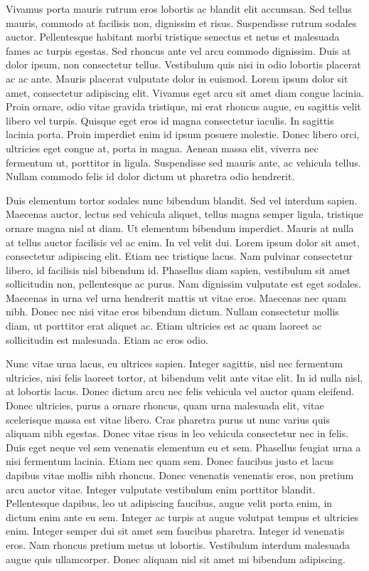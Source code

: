 Vivamus porta mauris rutrum eros lobortis ac blandit elit accumsan.
Sed tellus mauris, commodo at facilisis non, dignissim et risus.
Suspendisse rutrum sodales auctor.
Pellentesque habitant morbi tristique senectus et netus et malesuada fames ac turpis egestas.
Sed rhoncus ante vel arcu commodo dignissim.
Duis at dolor ipsum, non consectetur tellus.
Vestibulum quis nisi in odio lobortis placerat ac ac ante.
Mauris placerat vulputate dolor in euismod.
Lorem ipsum dolor sit amet, consectetur adipiscing elit.
Vivamus eget arcu sit amet diam congue lacinia.
Proin ornare, odio vitae gravida tristique, mi erat rhoncus augue, eu sagittis velit libero vel turpis.
Quisque eget eros id magna consectetur iaculis.
In sagittis lacinia porta.
Proin imperdiet enim id ipsum posuere molestie.
Donec libero orci, ultricies eget congue at, porta in magna.
Aenean massa elit, viverra nec fermentum ut, porttitor in ligula.
Suspendisse sed mauris ante, ac vehicula tellus.
Nullam commodo felis id dolor dictum ut pharetra odio hendrerit.

Duis elementum tortor sodales nunc bibendum blandit.
Sed vel interdum sapien.
Maecenas auctor, lectus sed vehicula aliquet, tellus magna semper ligula, tristique ornare magna nisl at diam.
Ut elementum bibendum imperdiet.
Mauris at nulla at tellus auctor facilisis vel ac enim.
In vel velit dui.
Lorem ipsum dolor sit amet, consectetur adipiscing elit.
Etiam nec tristique lacus.
Nam pulvinar consectetur libero, id facilisis nisl bibendum id.
Phasellus diam sapien, vestibulum sit amet sollicitudin non, pellentesque ac purus.
Nam dignissim vulputate est eget sodales.
Maecenas in urna vel urna hendrerit mattis ut vitae eros.
Maecenas nec quam nibh.
Donec nec nisi vitae eros bibendum dictum.
Nullam consectetur mollis diam, ut porttitor erat aliquet ac.
Etiam ultricies est ac quam laoreet ac sollicitudin est malesuada.
Etiam ac eros odio.

Nunc vitae urna lacus, eu ultrices sapien.
Integer sagittis, nisl nec fermentum ultricies, nisi felis laoreet tortor, at bibendum velit ante vitae elit.
In id nulla nisl, at lobortis lacus.
Donec dictum arcu nec felis vehicula vel auctor quam eleifend.
Donec ultricies, purus a ornare rhoncus, quam urna malesuada elit, vitae scelerisque massa est vitae libero.
Cras pharetra purus ut nunc varius quis aliquam nibh egestas.
Donec vitae risus in leo vehicula consectetur nec in felis.
Duis eget neque vel sem venenatis elementum eu et sem.
Phasellus feugiat urna a nisi fermentum lacinia.
Etiam nec quam sem.
Donec faucibus justo et lacus dapibus vitae mollis nibh rhoncus.
Donec venenatis venenatis eros, non pretium arcu auctor vitae.
Integer vulputate vestibulum enim porttitor blandit.
Pellentesque dapibus, leo ut adipiscing faucibus, augue velit porta enim, in dictum enim ante eu sem.
Integer ac turpis at augue volutpat tempus et ultricies enim.
Integer semper dui sit amet sem faucibus pharetra.
Integer id venenatis eros.
Nam rhoncus pretium metus ut lobortis.
Vestibulum interdum malesuada augue quis ullamcorper.
Donec aliquam nisl sit amet mi bibendum adipiscing.

